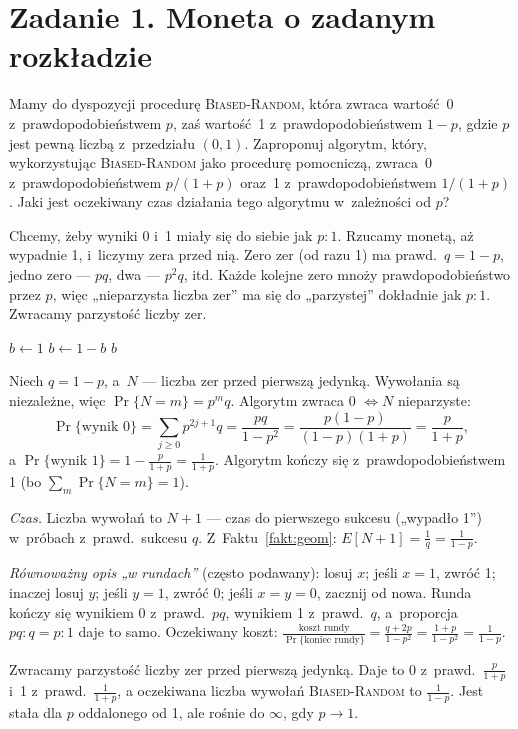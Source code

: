 \documentclass[11pt]{article}
\begin{document}
\section{Zadanie 1. Moneta o zadanym rozkładzie}
\begin{tresc}
Mamy do dyspozycji procedurę \textsc{Biased-Random}, która zwraca wartość~0
z~prawdopodobieństwem $p$, zaś wartość~1 z~prawdopodobieństwem $1-p$, gdzie $p$
jest pewną liczbą z~przedziału $(0,1)$. Zaproponuj algorytm, który,
wykorzystując \textsc{Biased-Random} jako procedurę pomocniczą, zwraca~0
z~prawdopodobieństwem $p/(1+p)$ oraz~1 z~prawdopodobieństwem $1/(1+p)$. Jaki
jest oczekiwany czas działania tego algorytmu w~zależności od $p$?
\end{tresc}

\begin{intuicja}
Chcemy, żeby wyniki 0 i~1 miały się do siebie jak $p:1$. Rzucamy monetą, aż
wypadnie 1, i~liczymy zera przed nią. Zero zer (od razu 1) ma prawd.\ $q=1-p$,
jedno zero --- $pq$, dwa --- $p^2q$, itd. Każde kolejne zero mnoży
prawdopodobieństwo przez $p$, więc „nieparzysta liczba zer” ma się do
„parzystej” dokładnie jak $p:1$. Zwracamy parzystość liczby zer.
\end{intuicja}

\begin{algorithm}[H]
\caption{\textsc{Parzystość}}
\begin{algorithmic}[1]
\State $b\gets1$ 
  \State $b\gets1-b$
\EndWhile
\State \Return $b$
\end{algorithmic}
\end{algorithm}

\formalnie
Niech $q=1-p$, a~$N$ --- liczba zer przed pierwszą jedynką. Wywołania są
niezależne, więc $\Pr\{N=m\}=p^mq$. Algorytm zwraca 0 $\iff N$ nieparzyste:
\[
\Pr\{\text{wynik }0\}=\sum_{j\ge0}p^{2j+1}q=\frac{pq}{1-p^2}=\frac{p(1-p)}{(1-p)(1+p)}=\frac{p}{1+p},
\]
a $\Pr\{\text{wynik }1\}=1-\frac{p}{1+p}=\frac{1}{1+p}$. Algorytm kończy się
z~prawdopodobieństwem 1 (bo $\sum_m\Pr\{N=m\}=1$).

\emph{Czas.} Liczba wywołań to $N+1$ --- czas do pierwszego sukcesu
(„wypadło 1”) w~próbach z~prawd.\ sukcesu $q$. Z~Faktu~\ref{fakt:geom}:
$E[N+1]=\frac1q=\frac{1}{1-p}$.

\emph{Równoważny opis „w rundach”} (często podawany): losuj $x$; jeśli $x=1$,
zwróć 1; inaczej losuj $y$; jeśli $y=1$, zwróć 0; jeśli $x=y=0$, zacznij od
nowa. Runda kończy się wynikiem 0 z~prawd.\ $pq$, wynikiem 1 z~prawd.\ $q$,
a~proporcja $pq:q=p:1$ daje to samo. Oczekiwany koszt:
$\frac{\text{koszt rundy}}{\Pr\{\text{koniec rundy}\}}=\frac{q+2p}{1-p^2}=\frac{1+p}{1-p^2}=\frac1{1-p}$.
\begin{odpowiedz}
Zwracamy parzystość liczby zer przed pierwszą jedynką. Daje to 0 z~prawd.\
$\frac{p}{1+p}$ i~1 z~prawd.\ $\frac1{1+p}$, a oczekiwana liczba wywołań
\textsc{Biased-Random} to $\frac{1}{1-p}$. Jest stała dla $p$ oddalonego od 1,
ale rośnie do $\infty$, gdy $p\to1$.
\end{odpowiedz}
\end{document}
